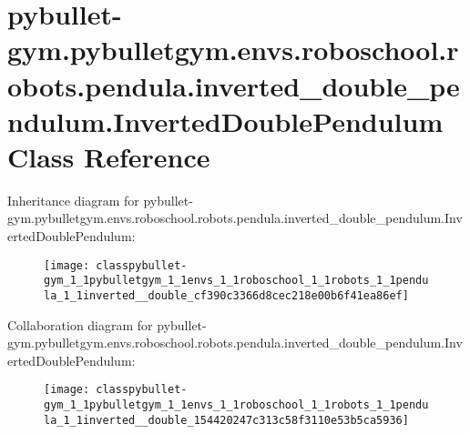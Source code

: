 \hypertarget{classpybullet-gym_1_1pybulletgym_1_1envs_1_1roboschool_1_1robots_1_1pendula_1_1inverted__double_632710b238162c34f237573ee2b501d2}{}\section{pybullet-\/gym.pybulletgym.\+envs.\+roboschool.\+robots.\+pendula.\+inverted\+\_\+double\+\_\+pendulum.\+Inverted\+Double\+Pendulum Class Reference}
\label{classpybullet-gym_1_1pybulletgym_1_1envs_1_1roboschool_1_1robots_1_1pendula_1_1inverted__double_632710b238162c34f237573ee2b501d2}


Inheritance diagram for pybullet-\/gym.pybulletgym.\+envs.\+roboschool.\+robots.\+pendula.\+inverted\+\_\+double\+\_\+pendulum.\+Inverted\+Double\+Pendulum\+:
\nopagebreak
\begin{figure}[H]
\begin{center}
\leavevmode
\texttt{[image: classpybullet-gym\_1\_1pybulletgym\_1\_1envs\_1\_1roboschool\_1\_1robots\_1\_1pendula\_1\_1inverted\_\_double\_cf390c3366d8cec218e00b6f41ea86ef]}
\end{center}
\end{figure}


Collaboration diagram for pybullet-\/gym.pybulletgym.\+envs.\+roboschool.\+robots.\+pendula.\+inverted\+\_\+double\+\_\+pendulum.\+Inverted\+Double\+Pendulum\+:
\nopagebreak
\begin{figure}[H]
\begin{center}
\leavevmode
\texttt{[image: classpybullet-gym\_1\_1pybulletgym\_1\_1envs\_1\_1roboschool\_1\_1robots\_1\_1pendula\_1\_1inverted\_\_double\_154420247c313c58f3110e53b5ca5936]}
\end{center}
\end{figure}
